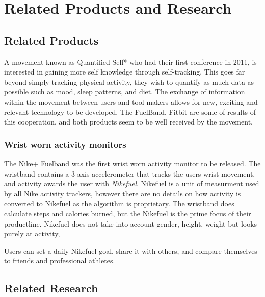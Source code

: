 \chapter{Related Products and Research} %

\label{Chapter3} %


\section{Related Products}

A movement known as Quantified Self*\cite{quantifiedSelf} who had their first conference in 2011\cite{bodyHackers}, is interested in gaining more self knowledge through self-tracking. This goes far beyond simply tracking physical activity, they wish to quantify as much data as possible such as mood, sleep patterns, and diet. The exchange of information within the movement between users and tool makers allows for new, exciting and relevant technology to be developed. The FuelBand\cite{fuelBand}, Fitbit\cite{fitBit} are some of results of this cooperation, and both products seem to be well received by the movement. %

\subsection{Wrist worn activity monitors}
The Nike+ Fuelband\cite{fuelBand} was the first wrist worn activity monitor to be released. The wristband contains a 3-axis accelerometer that tracks the users wrist movement, and activity awards the user with \emph{Nikefuel}. Nikefuel\cite{nikefuel} is a unit of measurment used by all Nike activity trackers, however there are no details on how activity is converted to Nikefuel as the algorithm is proprietary. The wristband does calculate steps and calories burned, but the Nikefuel is the prime focus of their productline. Nikefuel does not take into account gender, height, weight but looks purely at activity, 

Users can set a daily Nikefuel goal, share it with others, and compare themselves to friends and professional athletes. 

\section{Related Research}

